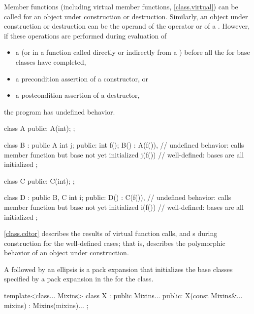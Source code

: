 \pnum
{}%
Member functions (including virtual member functions, \ref{class.virtual}) can be
called for an object under construction or destruction.
Similarly, an object under construction or destruction can be the operand of the
operator or of a
.
However, if these operations are performed
during evaluation of
\begin{itemize}
\item
a 
(or in a function called directly or indirectly from a
)
before all the
for base classes have completed,
\item
a precondition assertion of a constructor, or
\item
a postcondition assertion of a destructor,
\end{itemize}
the program has undefined behavior.
\begin{example}
\begin{codeblock}
class A {
public:
  A(int);
};

class B : public A {
  int j;
public:
  int f();
  B() : A(f()),     // undefined behavior: calls member function but base  not yet initialized
  j(f()) { }        // well-defined: bases are all initialized
};

class C {
public:
  C(int);
};

class D : public B, C {
  int i;
public:
  D() : C(f()),     // undefined behavior: calls member function but base  not yet initialized
  i(f()) { }        // well-defined: bases are all initialized
};
\end{codeblock}
\end{example}

\pnum
\begin{note}
\ref{class.cdtor} describes the results of virtual function calls,
and
s
during construction for the well-defined cases;
that is, describes the polymorphic behavior
of an object under construction.
\end{note}

\pnum
{}%
A  followed by an ellipsis is
a pack expansion that initializes the base
classes specified by a pack expansion in the 
for the class.
\begin{example}
\begin{codeblock}
template<class... Mixins>
class X : public Mixins... {
public:
  X(const Mixins&... mixins) : Mixins(mixins)... { }
};
\end{codeblock}

\end{example}

